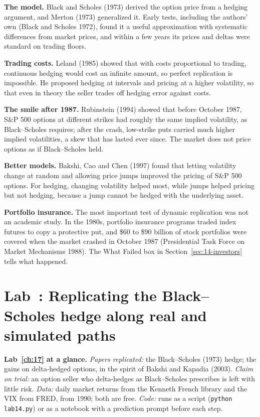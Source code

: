 \textbf{The model.} Black and Scholes (1973) derived the option price from a hedging argument, and Merton (1973) generalized it. Early tests, including the authors' own (Black and Scholes 1972), found it a useful approximation with systematic differences from market prices, and within a few years its prices and deltas were standard on trading floors.

\textbf{Trading costs.} Leland (1985) showed that with costs proportional to trading, continuous hedging would cost an infinite amount, so perfect replication is impossible. He proposed hedging at intervals and pricing at a higher volatility, so that even in theory the seller trades off hedging error against costs.

\textbf{The smile after 1987.} Rubinstein (1994) showed that before October 1987, S\&P 500 options at different strikes had roughly the same implied volatility, as Black--Scholes requires; after the crash, low-strike puts carried much higher implied volatilities, a skew that has lasted ever since. The market does not price options as if Black--Scholes held.

\textbf{Better models.} Bakshi, Cao and Chen (1997) found that letting volatility change at random and allowing price jumps improved the pricing of S\&P 500 options. For hedging, changing volatility helped most, while jumps helped pricing but not hedging, because a jump cannot be hedged with the underlying asset.

\textbf{Portfolio insurance.} The most important test of dynamic replication was not an academic study. In the 1980s, portfolio insurance programs traded index futures to copy a protective put, and \$60 to \$90 billion of stock portfolios were covered when the market crashed in October 1987 (Presidential Task Force on Market Mechanisms 1988). The What Failed box in Section~\ref{sec:14-investors} tells what happened.

\section{Lab~\thechapter: Replicating the Black--Scholes hedge along real and simulated paths}
\label{sec:14-lab}

\begin{callout}
\textbf{Lab~\ref{ch:17} at a glance.} \emph{Papers replicated:} the Black--Scholes (1973) hedge; the gains on delta-hedged options, in the spirit of Bakshi and Kapadia (2003). \emph{Claim on trial:} an option seller who delta-hedges as Black--Scholes prescribes is left with little risk. \emph{Data:} daily market returns from the Kenneth French library and the VIX from FRED, from 1990; both are free. \emph{Code:} runs as a script (\texttt{python lab14.py}) or as a notebook with a prediction prompt before each step.
\end{callout}

